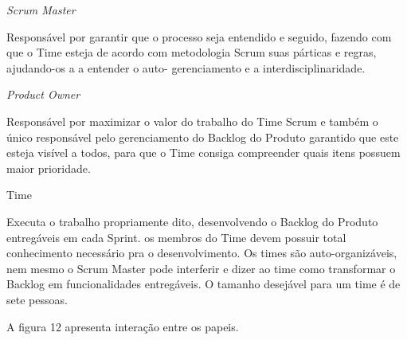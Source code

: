 \begin{alineascomponto}
\item \textit{Scrum Master}

Responsável por garantir que o processo seja entendido e seguido, fazendo com que o Time esteja de acordo com  metodologia Scrum suas párticas e regras, ajudando-os a a entender o auto- gerenciamento e a interdisciplinaridade.

\item \textit{Product Owner}

Responsável por maximizar o valor do trabalho do Time Scrum e também o único responsável pelo gerenciamento do Backlog do Produto garantido que este esteja visível a todos, para que o Time consiga compreender quais itens possuem maior prioridade. 

\item {Time}
	
Executa o trabalho propriamente dito, desenvolvendo o Backlog do Produto entregáveis em cada Sprint. os membros do Time devem possuir total conhecimento necessário pra o desenvolvimento. Os times são auto-organizáveis, nem mesmo o Scrum Master pode interferir e dizer ao time como transformar o Backlog em funcionalidades entregáveis.
O tamanho desejável para um time  é de sete pessoas.
\end{alineascomponto}

A figura 12 apresenta interação entre os papeis.

	\begin{figure}[h!]
		\centering
	\end{figure}

